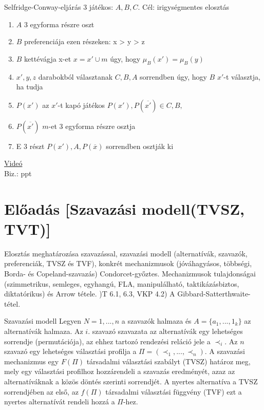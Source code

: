 	\begin{definition}{Selfridge-Conway-eljárás}{}
		3 játékos: $A, B, C$. Cél: irigységmentes elosztás
		\begin{enumerate}
			\item $A$ 3 egyforma részre oszt
			\item $B$ preferenciája ezen részeken: x > y > z
			\item $B$ kettévágja x-et $x=x' \cup m$ úgy, hogy $\mu_B(x') = \mu_B(y)$
			\item $x', y, z$ darabokból választanak $C, B, A$ sorrendben úgy, hogy $B$ $x'$-t választja, ha tudja
			\item $P(x')$ az $x'$-t kapó játékos $P(x'), P(\overline{x'}) \in {C, B}, $
			\item $P(\overline{x'})$ $m$-et 3 egyforma részre osztja
			\item E 3 részt $P(x'), A, P(\overline{x})$ sorrendben osztják ki 
		\end{enumerate}
	\end{definition}
	\href{https://youtu.be/kaMKInkV7Vs?si=KuY9wgFSSZ5t7DBd}{Videó} \\
	Biz.: ppt
	
	\newpage
	\section{Előadás [Szavazási modell(TVSZ, TVT)]}
	Elosztás meghatározása szavazással, szavazási modell (alternatívák, szavazók, preferenciák, TVSZ és TVF), konkrét mechanizmusok (jóváhagyásos, többségi, Borda- és Copeland-szavazás) Condorcet-győztes. Mechanizmusok tulajdonságai (szimmetrikus, semleges, egyhangú, FLA, manipulálható, taktikázásbiztos, diktatórikus) és Arrow tétele. )T 6.1, 6.3, VKP 4.2) A Gibbard-Satterthwaite-tétel.
	
	\begin{definition}{Szavazási modell}{}
		Legyen $N={1, ..., n}$ a szavazók halmaza és $A = \{a_1, ..., 1_k\}$ az alternatívák halmaza. Az $i.$ szavazó szavazata az alternatívák egy lehetséges sorrendje (permutációja), az ehhez tartozó rendezési reláció jele a $\prec_i$. Az $n$ szavazó egy lehetséges választási profilja a $\Pi = (\prec_1, ..., \prec_n)$. A szavazási mechanizmus egy $F(\Pi)$ társadalmi választási szabályt (TVSZ) határoz meg, mely egy választási profilhoz hozzárendeli a szavazás eredményét, azaz az alternatíváknak a közös döntés szerinti sorrendjét. A nyertes alternatíva a TVSZ sorrendjében az első, az $f(\Pi)$ társadalmi választási függvény (TVF) ezt a nyertes alternatívát rendeli hozzá a $\Pi$-hez.
	\end{definition}
	
